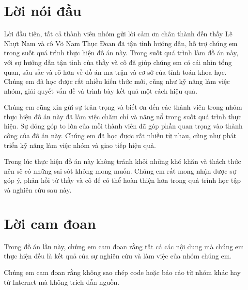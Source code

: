 \documentclass[a4paper]{article}
\renewcommand{\figurename}{Hình}
\begin{document}
\clearpage
\pagestyle{fancy}
\renewcommand{\contentsname}{Mục lục}
\renewcommand{\tablename}{Bảng}
\renewcommand{\figurename}{Hình}
\renewcommand{\refname}{Tài liệu tham khảo}

\tableofcontents
\thispagestyle{fancy}

\newpage

\renewcommand{\arraystretch}{1.3} %


\section*{Lời nói đầu}

Lời đầu tiên, tất cả thành viên nhóm gửi lời cảm ơn chân thành đến thầy Lê Nhựt Nam và cô Võ Nam Thục Đoan đã tận tình hướng dẫn, hỗ trợ chúng em trong suốt quá trình thực hiện đồ án này. Trong suốt quá trình làm đồ án này, với sự hướng dẫn tận tình của thầy và cô đã giúp chúng em có cái nhìn tổng quan, sâu sắc và rõ hơn về đồ án ma trận và cơ sở của tính toán khoa học. Chúng em đã học được rất nhiều kiến thức mới, cũng như kỹ năng làm việc nhóm, giải quyết vấn đề và trình bày kết quả một cách hiệu quả.

Chúng em cũng xin gửi sự trân trọng và biết ơn đến các thành viên trong nhóm thực hiện đồ án này đã làm việc chăm chỉ và năng nổ trong suốt quá trình thực hiện. Sự đóng góp to lớn của mỗi thành viên đã góp phần quan trọng vào thành công của đồ án này. Chúng em đã học được rất nhiều từ nhau, cũng như phát triển kỹ năng làm việc nhóm và giao tiếp hiệu quả.    

Trong lúc thực hiện đồ án này không tránh khỏi những khó khăn và thách thức nên sẽ có những sai sót không mong muốn. Chúng em rất mong nhận được sự góp ý, phản hồi từ thầy và cô để có thể hoàn thiện hơn trong quá trình học tập và nghiên cứu sau này.

\section*{Lời cam đoan}

Trong đồ án lần này, chúng em cam đoan rằng tất cả các nội dung mà chúng em thực hiện đều là kết quả của sự nghiên cứu và làm việc của nhóm chúng em. 

Chúng em cam đoan rằng không sao chép code hoặc báo cáo từ nhóm khác hay từ Internet mà không
trích dẫn nguồn. 
\end{document}
